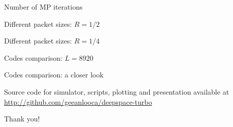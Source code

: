 \documentclass[xcolor={usenames,dvipsnames},11pt]{beamer}
\begin{document}
\begin{frame}[c]{Number of MP iterations}
    \begin{center}
        
    \end{center}
\end{frame}
\begin{frame}[c]{Different packet sizes: $R=1/2$}
    \begin{center}
        
    \end{center}
\end{frame}
\begin{frame}[c]{Different packet sizes: $R=1/4$}
    \begin{center}
        
    \end{center}
\end{frame}
\begin{frame}[c]{Codes comparison: $L=8920$}
    \begin{center}
        
    \end{center}
\end{frame}
\begin{frame}[c]{Codes comparison: a closer look}
    \begin{center}
        
    \end{center}
\end{frame}
\begin{frame}[standout]

    \begin{center}
        Source code for simulator, scripts, plotting and presentation available at \\ \url{http://github.com/geeanlooca/deepspace-turbo}
    \end{center}


    {
        \huge Thank you!
    }
\end{frame}
\end{document}
